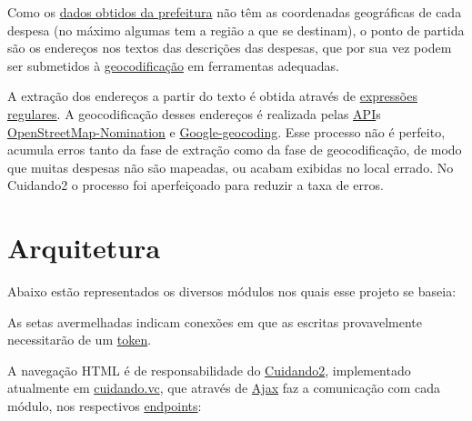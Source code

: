 \documentclass[letterpaper,10pt,portuges]{sphinxmanual}
\begin{document}
Como os \href{http://orcamento.prefeitura.sp.gov.br/orcamento/execucao.html}{dados obtidos da
prefeitura}
não têm as coordenadas geográficas de cada despesa (no máximo algumas
tem a região a que se destinam), o ponto de partida são os endereços nos
textos das descrições das despesas, que por sua vez podem ser submetidos
à \href{https://en.wikipedia.org/wiki/Geocoding}{geocodificação} em
ferramentas adequadas.

A extração dos endereços a partir do texto é obtida através de \href{https://pt.wikipedia.org/wiki/Express\%C3\%A3o\_regular}{expressões regulares}. A geocodificação desses endereços é realizada pelas \href{https://en.wikipedia.org/wiki/Application\_programming\_interface}{API}s
\href{http://wiki.openstreetmap.org/wiki/Nominatim}{OpenStreetMap-Nomination}
e \href{https://developers.google.com/maps/documentation/geocoding/intro}{Google-geocoding}.
Esse processo não é perfeito, acumula erros tanto da fase de extração
como da fase de geocodificação, de modo que muitas despesas não são
mapeadas, ou acabam exibidas no local errado. No Cuidando2 o processo
foi aperfeiçoado para reduzir a taxa de erros.


\chapter{Arquitetura}
\label{index:arquitetura}
Abaixo estão representados os diversos módulos nos quais esse projeto se
baseia:



As setas avermelhadas indicam conexões em que as escritas provavelmente
necessitarão de um
\href{https://github.com/okfn-brasil/viralata\#protocol}{token}.

A navegação HTML é de responsabilidade do \href{https://github.com/okfn-brasil/cuidando2}{Cuidando2}, implementado
atualmente em \href{https://cuidando.vc}{cuidando.vc}, que através de
\href{https://en.wikipedia.org/wiki/Ajax\_(programming)}{Ajax} faz a
comunicação com cada módulo, nos respectivos
\href{http://www.w3.org/TR/wsdl20/\#Endpoint}{endpoints}:
\end{document}
